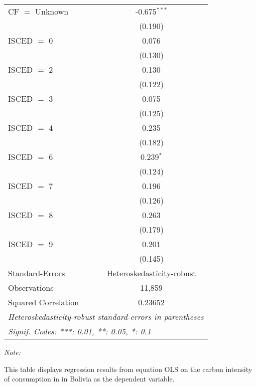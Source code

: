 \begin{table}[htbp!]
\begin{adjustbox}{width = 1\textwidth, max height = 0.95\textheight, center}
\begin{threeparttable}[b]
\begin{tabular}{lc}
            CF $=$ Unknown      & -0.675$^{***}$\\   
                                & (0.190)\\   
            ISCED $=$ 0         & 0.076\\   
                                & (0.130)\\   
            ISCED $=$ 2         & 0.130\\   
                                & (0.122)\\   
            ISCED $=$ 3         & 0.075\\   
                                & (0.125)\\   
            ISCED $=$ 4         & 0.235\\   
                                & (0.182)\\   
            ISCED $=$ 6         & 0.239$^{*}$\\   
                                & (0.124)\\   
            ISCED $=$ 7         & 0.196\\   
                                & (0.126)\\   
            ISCED $=$ 8         & 0.263\\   
                                & (0.179)\\   
            ISCED $=$ 9         & 0.201\\   
                                & (0.145)\\   
            \midrule 
            Standard-Errors     & Heteroskedasticity-robust \\   
            Observations        & 11,859\\  
            Squared Correlation & 0.23652\\  
            \midrule \midrule
            \multicolumn{2}{l}{\emph{Heteroskedasticity-robust standard-errors in parentheses}}\\
            \multicolumn{2}{l}{\emph{Signif. Codes: ***: 0.01, **: 0.05, *: 0.1}}\\
         \end{tabular}
         
         \begin{tablenotes}\item \medskip \textit{Note:}
            \item This table displays regression results from equation OLS on the carbon intensity of consumption in  in Bolivia as the dependent variable. 
         \end{tablenotes}
      \end{threeparttable}
   \end{adjustbox}
\end{table}


